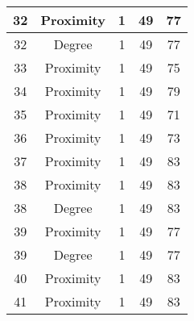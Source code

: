 \documentclass[results.tex]{subfiles}
\begin{document}
\begin{center}
\begin{tabular}{| c || c | c | c | c |}
            \hline
            32                      & Proximity                    & 1                      & 49                      & 77                   \\
            \hline
            32                      & Degree                       & 1                      & 49                      & 77                   \\
            \hline
            33                      & Proximity                    & 1                      & 49                      & 75                   \\
            \hline
            34                      & Proximity                    & 1                      & 49                      & 79                   \\
            \hline
            35                      & Proximity                    & 1                      & 49                      & 71                   \\
            \hline
            36                      & Proximity                    & 1                      & 49                      & 73                   \\
            \hline
            37                      & Proximity                    & 1                      & 49                      & 83                   \\
            \hline
            38                      & Proximity                    & 1                      & 49                      & 83                   \\
            \hline
            38                      & Degree                       & 1                      & 49                      & 83                   \\
            \hline
            39                      & Proximity                    & 1                      & 49                      & 77                   \\
            \hline
            39                      & Degree                       & 1                      & 49                      & 77                   \\
            \hline
            40                      & Proximity                    & 1                      & 49                      & 83                   \\
            \hline
            41                      & Proximity                    & 1                      & 49                      & 83                   \\

\end{tabular}
\end{center}
\end{document}
